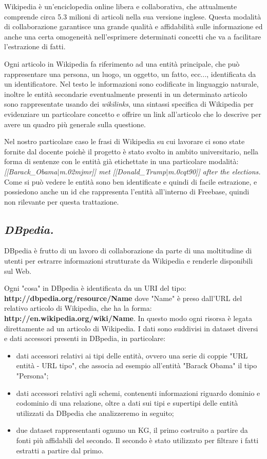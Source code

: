 \documentclass[10pt,a4paper,twocolumn]{article}
\begin{document}
Wikipedia è un'enciclopedia online libera e collaborativa, che attualmente comprende circa 5.3 milioni di articoli nella sua versione inglese. Questa modalità di collaborazione garantisce una grande qualità e affidabilità sulle informazione ed anche una certa omogeneità nell'esprimere determinati concetti che va a facilitare l'estrazione di fatti.
 
Ogni articolo in Wikipedia fa riferimento ad una entità principale, che può rappresentare una persona, un luogo, un oggetto, un fatto, ecc..., identificata da un identificatore. Nel testo le informazioni sono codificate in linguaggio naturale, inoltre le entità secondarie eventualmente presenti in un determinato articolo sono rappresentate usando dei \textit{wikilinks}, una sintassi specifica di Wikipedia per evidenziare un particolare concetto e offrire un link all'articolo che lo descrive per avere un quadro più generale sulla questione.

Nel nostro particolare caso le frasi di Wikipedia su cui lavorare ci sono state fornite dal docente poichè il progetto è stato svolto in ambito universitario, nella forma di sentenze con le entità già etichettate in una particolare modalità:
\bigbreak
\textit{[[Barack\_Obama$|$m.02mjmr]] met [[Donald\_Trump$|$m.0cqt90]] after the elections.}
\bigbreak
Come si può vedere le entità sono ben identificate e quindi di facile estrazione, e possiedono anche un id che rappresenta l'entità all'interno di Freebase, quindi non rilevante per questa trattazione.

\subsection*{\textit{DBpedia.}}

DBpedia è frutto di un lavoro di collaborazione da parte di una moltitudine di utenti per estrarre informazioni strutturate da Wikipedia e renderle disponibili sul Web.

Ogni "cosa" in DBpedia è identificata da un URI del tipo:
\bigbreak
\textbf{http://dbpedia.org/resource/Name}
\bigbreak
dove "Name" è preso dall'URL del relativo articolo di Wikipedia, che ha la forma:
\bigbreak
\textbf{http://en.wikipedia.org/wiki/Name}.
\bigbreak
In questo modo ogni risorsa è legata direttamente ad un articolo di Wikipedia. I dati sono suddivisi in dataset diversi e dati accessori presenti in DBpedia, in particolare:
\begin{itemize}
\item dati accessori relativi ai tipi delle entità, ovvero una serie di coppie "URL entità - URL tipo", che associa ad esempio all'entità "Barack Obama" il tipo "Persona";
\item dati accessori relativi agli schemi, contenenti informazioni riguardo dominio e codominio di una relazione, oltre a dati sui tipi e supertipi delle entità utilizzati da DBpedia che analizzeremo in seguito;
\item due dataset rappresentanti ognuno un KG, il primo costruito a partire da fonti più affidabili del secondo. Il secondo è stato utilizzato per filtrare i fatti estratti a partire dal primo.
\end{itemize}
\end{document}
